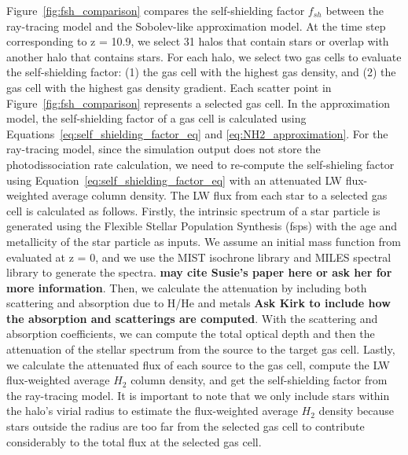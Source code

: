 \documentclass[linenumbers, twocolumn]{aastex631}
\begin{document}
Figure~\ref{fig:fsh_comparison} compares the self-shielding factor $f_{sh}$ between the ray-tracing model and the Sobolev-like approximation model. At the time step corresponding to z = 10.9, we select 31 halos that contain stars or overlap with another halo that contains stars. For each halo, we select two gas cells to evaluate the self-shielding factor: (1) the gas cell with the highest gas density, and (2) the gas cell with the highest gas density gradient. Each scatter point in Figure~\ref{fig:fsh_comparison} represents a selected gas cell. In the approximation model, the self-shielding factor of a gas cell is calculated using Equations~\ref{eq:self_shielding_factor_eq} and \ref{eq:NH2_approximation}. For the ray-tracing model, since the simulation output does not store the photodissociation rate calculation, we need to re-compute the self-shieling factor using Equation~\ref{eq:self_shielding_factor_eq} with an attenuated LW flux-weighted average column density. The LW flux from each star to a selected gas cell is calculated as follows. Firstly, the intrinsic spectrum of a star particle is generated using the Flexible Stellar Population Synthesis (fsps) with the age and metallicity of the star particle as inputs. We assume an initial mass function from \cite{Dave+2008} evaluated at z = 0, and we use the MIST isochrone library and MILES spectral library to generate the spectra. \textbf{may cite Susie's paper here or ask her for more information}. Then, we calculate the attenuation by including both scattering and absorption due to H/He and metals \textbf{Ask Kirk to include how the absorption and scatterings are computed}. With the scattering and absorption coefficients, we can compute the total optical depth and then the attenuation of the stellar spectrum from the source to the target gas cell. Lastly, we calculate the attenuated flux of each source to the gas cell, compute the LW flux-weighted average $H_{2}$ column density, and get the self-shielding factor from the ray-tracing model. It is important to note that we only include stars within the halo's virial radius to estimate the flux-weighted average $H_{2}$ density because stars outside the radius are too far from the selected gas cell to contribute considerably to the total flux at the selected gas cell. 
\end{document}
